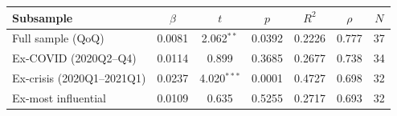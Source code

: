 \begin{tabular}{lcccccc}
\toprule
Subsample & $\beta$ & $t$ & $p$ & $R^2$ & $\rho$ & $N$ \\
\midrule
Full sample (QoQ) & 0.0081 & 2.062$^{**}$ & 0.0392 & 0.2226 & 0.777 & 37 \\
Ex-COVID (2020Q2--Q4) & 0.0114 & 0.899 & 0.3685 & 0.2677 & 0.738 & 34 \\
Ex-crisis (2020Q1--2021Q1) & 0.0237 & 4.020$^{***}$ & 0.0001 & 0.4727 & 0.698 & 32 \\
Ex-most influential & 0.0109 & 0.635 & 0.5255 & 0.2717 & 0.693 & 32 \\
\bottomrule
\end{tabular}
